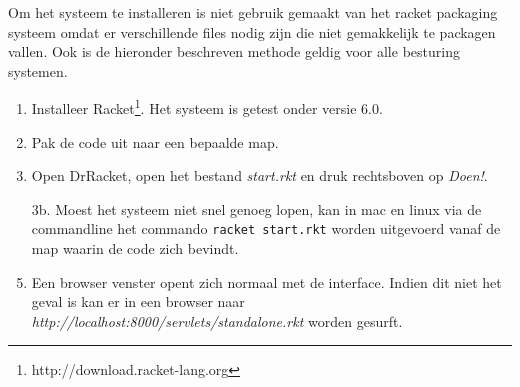 \documentclass{article}
\begin{document}
Om het systeem te installeren is niet gebruik gemaakt van het racket packaging systeem omdat er verschillende files nodig zijn die niet gemakkelijk te packagen vallen. Ook is de hieronder beschreven methode geldig voor alle besturing systemen.
\begin{enumerate}
	\item Installeer Racket\footnote{http://download.racket-lang.org}. Het systeem is getest onder versie 6.0.
	\item Pak de code uit naar een bepaalde map.
	\item Open DrRacket, open het bestand \emph{start.rkt} en druk rechtsboven op \emph{Doen!}. 
	\item[3b.] Moest het systeem niet snel genoeg lopen, kan in mac en linux via de commandline het commando \lstinline|racket start.rkt| worden uitgevoerd vanaf de map waarin de code zich bevindt. 
	\item Een browser venster opent zich normaal met de interface. Indien dit niet het geval is kan er in een browser naar\\ \emph{http://localhost:8000/servlets/standalone.rkt} worden gesurft.
\end{enumerate}
\end{document}
